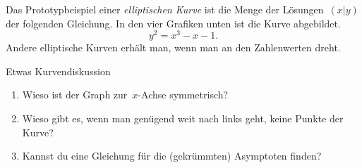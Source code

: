 \documentclass{../zirkelblatt}
\begin{document}

Das Prototypbeispiel einer \emph{elliptischen Kurve} ist die Menge der
Lösungen~$(x|y)$ der folgenden Gleichung. In den vier Grafiken unten ist die
Kurve abgebildet.
\[ y^2 = x^3 - x - 1. \]
Andere elliptische Kurven erhält man, wenn man an den Zahlenwerten dreht.

\begin{aufgabeShaded}{Etwas Kurvendiskussion}
\begin{enumerate}
\item Wieso ist der Graph zur~$x$-Achse symmetrisch?
\item Wieso gibt es, wenn man genügend weit nach links geht, keine Punkte der
Kurve?
\item Kannst du eine Gleichung für die (gekrümmten) Asymptoten finden?
\end{enumerate}
\end{aufgabeShaded}
\end{document}
